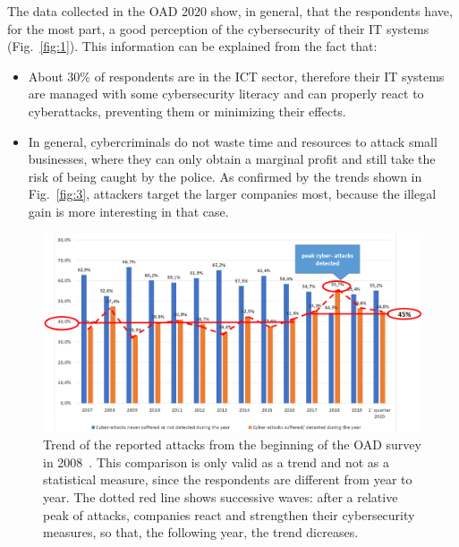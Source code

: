 \documentclass{easychair}
\begin{document}
The data collected in the OAD 2020 show, in general, that the respondents have, for the most part,
a good perception of the cybersecurity of their IT systems (Fig.~\ref{fig:1}).
This information can be explained from the fact that:
 
\begin{itemize}
\item About 30\% of respondents are in the ICT sector, therefore their IT systems
  are managed with some cybersecurity literacy and can properly react to cyberattacks, preventing 
  them or minimizing their effects.

\item In general, cybercriminals do not waste time and resources to attack small businesses,
  where they can only obtain a marginal profit and still
  take the risk of being caught by the police.  As confirmed by the trends shown
  in Fig.~\ref{fig:3}, attackers target the larger companies most,
  because the illegal gain is more interesting in that case.
\end{itemize}


\begin{figure}
  \centering
  \includegraphics[width=1\textwidth]{pictures/fig2.png}
  \caption{Trend of the reported attacks from the beginning of the OAD survey
    in 2008~\cite{oad20}. This comparison is only valid as a trend and not as a statistical
    measure, since the respondents are different from year to year. The dotted red line shows
    successive waves: after a relative peak of attacks, companies react and strengthen
    their cybersecurity measures, so that, the following year, the trend dicreases.}
  \label{fig:2}
\end{figure}
\end{document}
